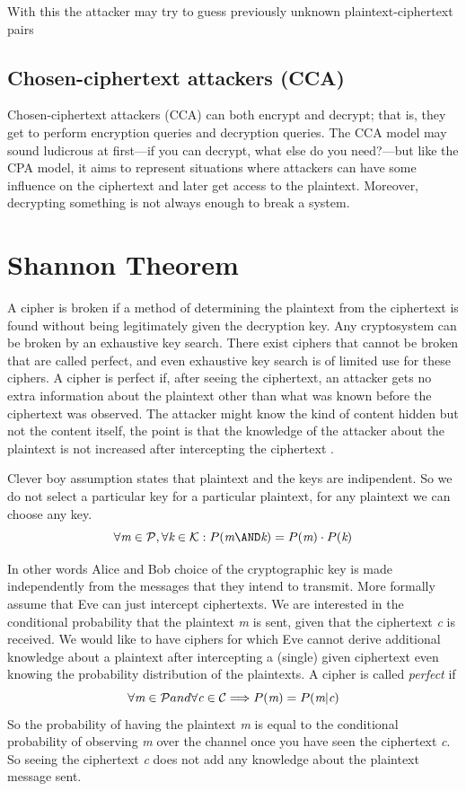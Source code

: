 	With this the attacker may try to guess previously unknown plaintext-ciphertext pairs
	
	
	\subsection{Chosen-ciphertext attackers (CCA)}
	Chosen-ciphertext attackers (CCA) can both encrypt and decrypt; that is, they get to perform encryption queries and decryption queries. The CCA model may sound ludicrous at first—if you can decrypt, what else do you need?—but like the CPA model, it aims to represent situations where attackers can have some influence on the ciphertext and later get access to the plaintext. Moreover, decrypting something is not always enough to break a system.

\section{Shannon Theorem}

A cipher is broken if a method of determining the plaintext from the ciphertext is found without being legitimately given the decryption key. Any cryptosystem can be broken by an exhaustive key search. There exist ciphers that cannot be broken that are called perfect, and even exhaustive key search is of limited use for these ciphers.
A cipher is perfect if, after seeing the ciphertext, an attacker gets no extra information about the plaintext other than what was known before the ciphertext was observed. The attacker might know the kind of content hidden but not the content itself, the point is that the knowledge of the attacker about the plaintext is not increased after intercepting the ciphertext . 

Clever boy assumption states that plaintext and the keys are indipendent. So we do not select a particular key for a particular plaintext, for any plaintext we can choose any key.
$$\forall\emph{m}\in\mathcal{P}, \forall\emph{k}\in\mathcal{K}: P(\emph{m} \AND \emph{k}) = P(\emph{m}) \cdot P(\emph{k})$$

In other words Alice and Bob choice of the cryptographic key is made 	independently from the messages that they intend to transmit.
More formally assume that Eve can just intercept ciphertexts. We are interested in the conditional probability that the plaintext \emph{m} is sent, given that the ciphertext \emph{c} is received. We would like to have ciphers for which Eve cannot derive additional knowledge about a plaintext after intercepting a (single) given ciphertext even knowing the probability distribution of the plaintexts.
A cipher is called \emph{perfect} if
$$\forall\emph{m}\in\mathcal{P} and \forall\emph{c}\in\mathcal{C} \Longrightarrow P(\emph{m}) = P(\emph{m}|\emph{c}) $$
So the probability of having the plaintext \emph{m} is equal to the conditional probability of observing \emph{m} over the channel once you have seen the ciphertext \emph{c}. So seeing the ciphertext \emph{c} does not add any knowledge about the plaintext message sent.

